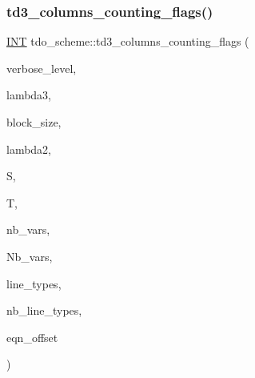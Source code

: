 \subsubsection{\texorpdfstring{td3\+\_\+columns\+\_\+counting\+\_\+flags()}{td3\_columns\_counting\_flags()}}
{\footnotesize\ttfamily \mbox{\hyperlink{galois_8h_a09fddde158a3a20bd2dcadb609de11dc}{I\+NT}} tdo\+\_\+scheme\+::td3\+\_\+columns\+\_\+counting\+\_\+flags (\begin{DoxyParamCaption}\item[{\mbox{\hyperlink{galois_8h_a09fddde158a3a20bd2dcadb609de11dc}{I\+NT}}}]{verbose\+\_\+level,  }\item[{\mbox{\hyperlink{galois_8h_a09fddde158a3a20bd2dcadb609de11dc}{I\+NT}}}]{lambda3,  }\item[{\mbox{\hyperlink{galois_8h_a09fddde158a3a20bd2dcadb609de11dc}{I\+NT}}}]{block\+\_\+size,  }\item[{\mbox{\hyperlink{galois_8h_a09fddde158a3a20bd2dcadb609de11dc}{I\+NT}}}]{lambda2,  }\item[{\mbox{\hyperlink{galois_8h_a09fddde158a3a20bd2dcadb609de11dc}{I\+NT}} \&}]{S,  }\item[{\mbox{\hyperlink{classtdo__data}{tdo\+\_\+data}} \&}]{T,  }\item[{\mbox{\hyperlink{galois_8h_a09fddde158a3a20bd2dcadb609de11dc}{I\+NT}}}]{nb\+\_\+vars,  }\item[{\mbox{\hyperlink{galois_8h_a09fddde158a3a20bd2dcadb609de11dc}{I\+NT}}}]{Nb\+\_\+vars,  }\item[{\mbox{\hyperlink{galois_8h_a09fddde158a3a20bd2dcadb609de11dc}{I\+NT}} $\ast$\&}]{line\+\_\+types,  }\item[{\mbox{\hyperlink{galois_8h_a09fddde158a3a20bd2dcadb609de11dc}{I\+NT}} \&}]{nb\+\_\+line\+\_\+types,  }\item[{\mbox{\hyperlink{galois_8h_a09fddde158a3a20bd2dcadb609de11dc}{I\+NT}}}]{eqn\+\_\+offset }\end{DoxyParamCaption})}

\mbox{\label{classtdo__scheme_a511aae77449403d460f4bbcab809de95}} 
